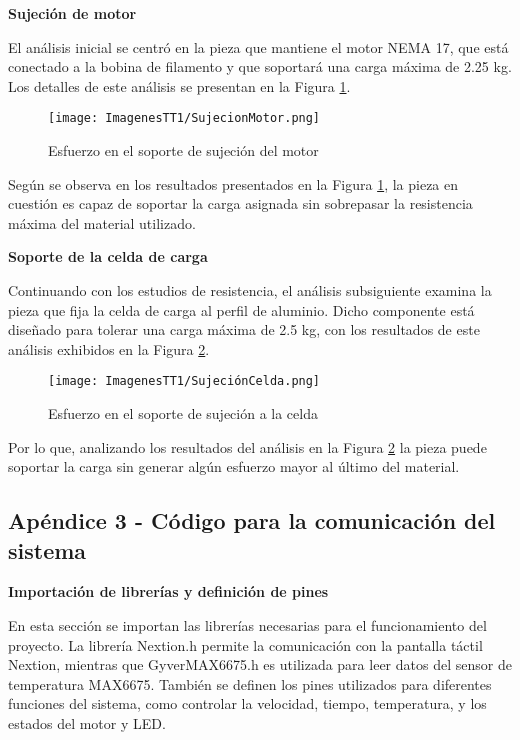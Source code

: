 \documentclass[14pt,oneside]{extarticle} %
\begin{document}
\textbf{Sujeción de motor}

El análisis inicial se centró en la pieza que mantiene el motor NEMA 17, que está conectado a la bobina de filamento y que soportará una carga máxima de 2.25 kg. Los detalles de este análisis se presentan en la Figura \ref{fig:SujecionMotor}.

\begin{figure}[H]
    \centering
    \texttt{[image: ImagenesTT1/SujecionMotor.png]}
    \caption{Esfuerzo en el soporte de sujeción del motor}
    \label{fig:SujecionMotor}
\end{figure}

Según se observa en los resultados presentados en la Figura \ref{fig:SujecionMotor}, la pieza en cuestión es capaz de soportar la carga asignada sin sobrepasar la resistencia máxima del material utilizado.

\textbf{Soporte de la celda de carga}

Continuando con los estudios de resistencia, el análisis subsiguiente examina la pieza que fija la celda de carga al perfil de aluminio. Dicho componente está diseñado para tolerar una carga máxima de 2.5 kg, con los resultados de este análisis exhibidos en la Figura \ref{fig:SujeciónCelda}.

\begin{figure}[H]
    \centering
    \texttt{[image: ImagenesTT1/SujeciónCelda.png]}
    \caption{Esfuerzo en el soporte de sujeción a la celda}
    \label{fig:SujeciónCelda}
\end{figure}

Por lo que, analizando los resultados del análisis en la Figura \ref{fig:SujeciónCelda} la pieza puede
soportar la carga sin generar algún esfuerzo mayor al último del material.



\newpage

\subsection{Apéndice 3 - Código para la comunicación del sistema}

\textbf{Importación de librerías y definición de pines}

En esta sección se importan las librerías necesarias para el funcionamiento del proyecto. La librería Nextion.h permite la comunicación con la pantalla táctil Nextion, mientras que GyverMAX6675.h es utilizada para leer datos del sensor de temperatura MAX6675. También se definen los pines utilizados para diferentes funciones del sistema, como controlar la velocidad, tiempo, temperatura, y los estados del motor y LED.
\end{document}
